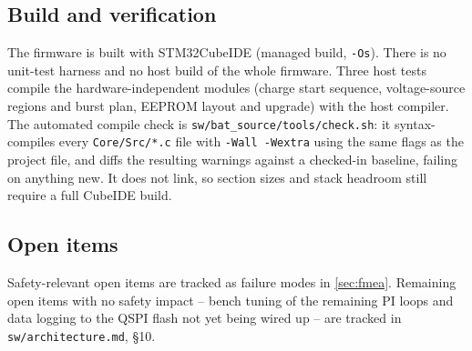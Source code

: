 \subsection{Build and verification}

The firmware is built with STM32CubeIDE (managed build, \texttt{-Os}).
There is no unit-test harness and no host build of the whole firmware. Three
host tests compile the hardware-independent modules (charge start sequence,
voltage-source regions and burst plan, \ac{EEPROM} layout and upgrade) with
the host compiler. The automated compile check is \texttt{sw/bat\_source/tools/check.sh}: it syntax-compiles every
\texttt{Core/Src/*.c} file with \texttt{-Wall -Wextra} using the same flags
as the project file, and diffs the resulting warnings against a checked-in
baseline, failing on anything new. It does not link, so section sizes and
stack headroom still require a full CubeIDE build.

\subsection{Open items}

Safety-relevant open items are tracked as failure modes in
\autoref{sec:fmea}. Remaining open items with no safety impact --
bench tuning of the remaining PI loops and data logging to the QSPI flash not yet being wired up -- are
tracked in \texttt{sw/architecture.md}, \S10.
